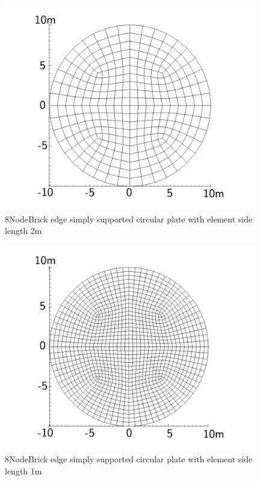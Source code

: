 \documentclass[fleqn,11pt]{article}
\begin{document}
\begin{figure}[H]
  \centering
  \includegraphics[width=11cm]{../Figure-files/circular_plate3.pdf}
  \caption{8NodeBrick edge simply supported circular plate with element side length 2m }
  \label{fig 8NodeBrick edges simply supported circular plate with element side length 2m }
\end{figure}

\newpage

\begin{figure}[H]
  \centering
  \includegraphics[width=11cm]{../Figure-files/circular_plate4.pdf}
  \caption{8NodeBrick edge simply supported circular plate with element side length 1m }
  \label{fig 8NodeBrick edges simply supported circular plate with element side length 1m }
\end{figure}
\end{document}
